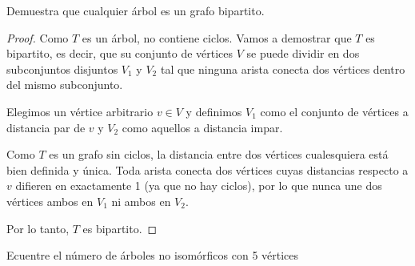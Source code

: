  Demuestra que cualquier árbol es un grafo bipartito.


\begin{proof}
Como $T$ es un árbol, no contiene ciclos. Vamos a demostrar que $T$ es bipartito, es decir, que su conjunto de vértices $V$ se puede dividir en dos subconjuntos disjuntos $V_1$ y $V_2$ tal que ninguna arista conecta dos vértices dentro del mismo subconjunto.

Elegimos un vértice arbitrario $v \in V$ y definimos $V_1$ como el conjunto de vértices a distancia par de $v$ y $V_2$ como aquellos a distancia impar.

Como $T$ es un grafo sin ciclos, la distancia entre dos vértices cualesquiera está bien definida y única. Toda arista conecta dos vértices cuyas distancias respecto a $v$ difieren en exactamente 1 (ya que no hay ciclos), por lo que nunca une dos vértices ambos en $V_1$ ni ambos en $V_2$.

Por lo tanto, $T$ es bipartito.
\end{proof}

  Ecuentre el número de árboles no isomórficos con 5 vértices
